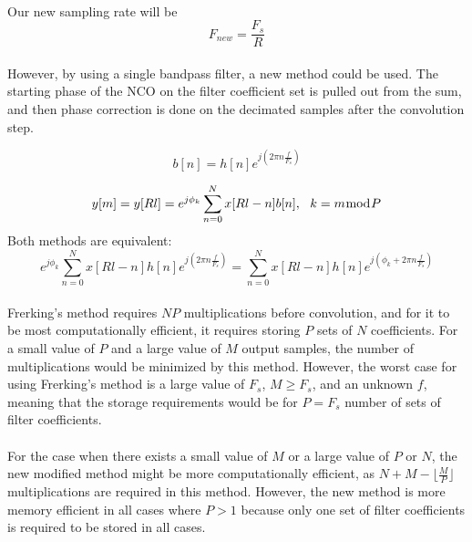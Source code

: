 \documentclass{article}
\begin{document}
        \paragraph{}
        Our new sampling rate will be
        \begin{equation}
            {F}_{new} = \frac{{F}_{s}}{R}
        \end{equation}

        \paragraph{}
        However, by using a single bandpass filter, a new method could be used. The starting phase of the NCO on the filter coefficient set is pulled out from the sum, and then phase correction is done on the decimated samples after the convolution step.

        \begin{equation}
            {{b}[n]} = h[n]e^{j({2{\pi}n\frac{f}{{F}_s}})}
        \end{equation}

        \begin{equation}
            {y[m]} = {y[Rl]} = e^{j{\phi}_k} \sum\limits_{n=0}^N x[Rl-n]{b[n]},\ \ k = m{\bmod}P
        \end{equation}
        Both methods are equivalent:
        \begin{equation}
            e^{j{\phi}_k} \sum\limits_{n=0}^N x[Rl-n]h[n]e^{j(2{\pi}n\frac{f}{{F}_s})} = \sum\limits_{n=0}^N x[Rl-n]h[n]e^{j({\phi}_k + 2{\pi}n\frac{f}{{F}_s})}
        \end{equation}

        \paragraph{}

        Frerking's method requires $NP$ multiplications before convolution, and for it to be most computationally efficient, it requires storing $P$ sets of $N$ coefficients. For a small value of $P$ and a large value of $M$ output samples, the number of multiplications would be minimized by this method. However, the worst case for using Frerking's method is a large value of ${F}_s$, $M \ge {F}_s$, and an unknown $f$, meaning that the storage requirements would be for $P = {F}_s$ number of sets of filter coefficients.
        \paragraph{}
        For the case when there exists a small value of $M$ or a large value of $P$ or $N$, the new modified method might be more computationally efficient, as $N + M - \lfloor {\frac{M}{P}} \rfloor $ multiplications are required in this method. However, the new method is more memory efficient in all cases where $P > 1$ because only one set of filter coefficients is required to be stored in all cases.
\end{document}

